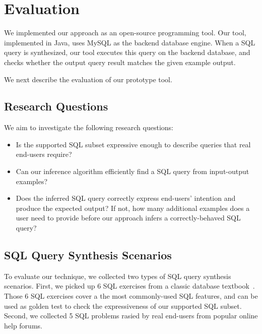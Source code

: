 
\section{Evaluation}
\label{sec:evaluation}

We implemented our approach as an open-source programming tool. Our tool, implemented
in Java, uses MySQL as the backend database engine. When a SQL query is synthesized,
our tool executes this query on the backend database, and checks whether the output
query result matches the given example output.

We next describe the evaluation of our prototype tool.

\subsection{Research Questions}

We aim to investigate the following research questions:

\begin{itemize}
\item Is the supported SQL subset expressive enough to describe
queries that real end-users require?

\item Can our inference algorithm efficiently find a SQL query
from input-output examples?

\item Does the inferred SQL query correctly express end-users'
intention and produce the expected output? If not, how many
additional examples does a user need to provide before our
approach infers a correctly-behaved SQL query?

\end{itemize}


\subsection{SQL Query Synthesis Scenarios}

To evaluate our technique, we collected two types of
SQL query synthesis scenarios. First, we picked
up 6 SQL exercises from a classic database textbook~\cite{cowbook}.
Those 6 SQL exercises cover a the most commonly-used SQL features,
and can be used as golden test to check the expressiveness
of our supported SQL subset. Second, we collected
5 SQL problems rasied by real end-users from popular online help forums.


